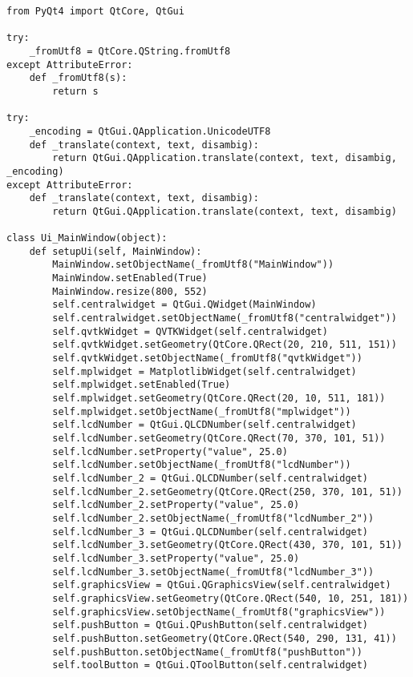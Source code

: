 \lstset{language=Python}
\begin{lstlisting}
from PyQt4 import QtCore, QtGui

try:
    _fromUtf8 = QtCore.QString.fromUtf8
except AttributeError:
    def _fromUtf8(s):
        return s

try:
    _encoding = QtGui.QApplication.UnicodeUTF8
    def _translate(context, text, disambig):
        return QtGui.QApplication.translate(context, text, disambig, _encoding)
except AttributeError:
    def _translate(context, text, disambig):
        return QtGui.QApplication.translate(context, text, disambig)

class Ui_MainWindow(object):
    def setupUi(self, MainWindow):
        MainWindow.setObjectName(_fromUtf8("MainWindow"))
        MainWindow.setEnabled(True)
        MainWindow.resize(800, 552)
        self.centralwidget = QtGui.QWidget(MainWindow)
        self.centralwidget.setObjectName(_fromUtf8("centralwidget"))
        self.qvtkWidget = QVTKWidget(self.centralwidget)
        self.qvtkWidget.setGeometry(QtCore.QRect(20, 210, 511, 151))
        self.qvtkWidget.setObjectName(_fromUtf8("qvtkWidget"))
        self.mplwidget = MatplotlibWidget(self.centralwidget)
        self.mplwidget.setEnabled(True)
        self.mplwidget.setGeometry(QtCore.QRect(20, 10, 511, 181))
        self.mplwidget.setObjectName(_fromUtf8("mplwidget"))
        self.lcdNumber = QtGui.QLCDNumber(self.centralwidget)
        self.lcdNumber.setGeometry(QtCore.QRect(70, 370, 101, 51))
        self.lcdNumber.setProperty("value", 25.0)
        self.lcdNumber.setObjectName(_fromUtf8("lcdNumber"))
        self.lcdNumber_2 = QtGui.QLCDNumber(self.centralwidget)
        self.lcdNumber_2.setGeometry(QtCore.QRect(250, 370, 101, 51))
        self.lcdNumber_2.setProperty("value", 25.0)
        self.lcdNumber_2.setObjectName(_fromUtf8("lcdNumber_2"))
        self.lcdNumber_3 = QtGui.QLCDNumber(self.centralwidget)
        self.lcdNumber_3.setGeometry(QtCore.QRect(430, 370, 101, 51))
        self.lcdNumber_3.setProperty("value", 25.0)
        self.lcdNumber_3.setObjectName(_fromUtf8("lcdNumber_3"))
        self.graphicsView = QtGui.QGraphicsView(self.centralwidget)
        self.graphicsView.setGeometry(QtCore.QRect(540, 10, 251, 181))
        self.graphicsView.setObjectName(_fromUtf8("graphicsView"))
        self.pushButton = QtGui.QPushButton(self.centralwidget)
        self.pushButton.setGeometry(QtCore.QRect(540, 290, 131, 41))
        self.pushButton.setObjectName(_fromUtf8("pushButton"))
        self.toolButton = QtGui.QToolButton(self.centralwidget)

\end{lstlisting}
